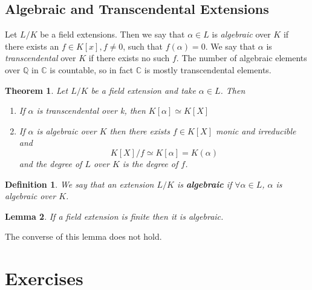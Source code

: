 \documentclass{article}
\newcommand{\C}{\mathbb{C}}
\newcommand{\Q}{\mathbb{Q}}
\newtheorem{theorem}{Theorem}[section]
\newtheorem{lemma}[theorem]{Lemma}
\newtheorem*{definition}{Definition}
\theoremstyle{remark}
\begin{document}
    \subsection{Algebraic and Transcendental Extensions}
    Let $L/K$ be a field extensions. Then we say that $\alpha\in L $ is \textit{algebraic} over $K$ if there exists an $f\in K[x], f\neq 0$, such that $f(\alpha)=0$.
    We say that $\alpha$ is \textit{transcendental} over $K$ if there exists no such $f$.
    The number of algebraic elements over $\Q$ in $\C$ is countable, so in fact $\C$ is mostly transcendental elements.

    \begin{theorem}
        Let $L/K$ be a field extension and take $\alpha\in L$. Then
        \begin{enumerate}
            \item If $\alpha$ is transcendental over k, then $K[\alpha]\simeq K[X]$
            \item If $\alpha$ is algebraic over $K$ then there exists $f\in K[X]$ monic and irreducible and
                $$ K[X]/f\simeq K[\alpha]=K(\alpha)$$
                and the degree of $L$ over $K$ is the degree of $f$.
        \end{enumerate}
    \end{theorem}

    \begin{definition}
        We say that an extension $L/K$ is \textbf{algebraic} if $\forall \alpha\in L$, $\alpha$ is algebraic over $K$.
    \end{definition}
    \begin{lemma}
        If a field extension is finite then it is algebraic.
    \end{lemma}
    The converse of this lemma does not hold.

    \newpage
    \section{Exercises}
    
\end{document}
